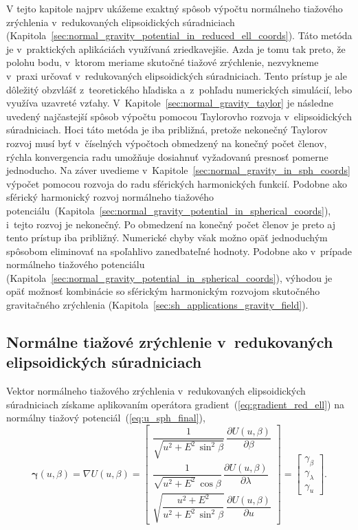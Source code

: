\documentclass[a4paper,12pt]{book}
\begin{document}
V tejto kapitole najprv ukážeme exaktný spôsob výpočtu normálneho tiažového 
zrýchlenia v~redukovaných elipsoidických súradniciach 
(Kapitola~\ref{sec:normal_gravity_potential_in_reduced_ell_coords}).  Táto 
metóda je v~praktických aplikáciách využívaná zriedkavejšie.  Azda je tomu tak 
preto, že polohu bodu, v~ktorom meriame skutočné tiažové zrýchlenie, nezvykneme 
v~praxi určovať v~redukovaných elipsoidických súradniciach.  Tento prístup je 
ale dôležitý obzvlášť z~teoretického hľadiska a~z~pohľadu numerických 
simulácií, lebo využíva uzavreté vzťahy.  
V~Kapitole~\ref{sec:normal_gravity_taylor} je následne uvedený najčastejší 
spôsob výpočtu pomocou Taylorovho rozvoja v~elipsoidických súradniciach.  Hoci 
táto metóda je iba približná, pretože nekonečný Taylorov rozvoj musí byť 
v~číselných výpočtoch obmedzený na konečný počet členov, rýchla konvergencia 
radu umožňuje dosiahnuť vyžadovanú presnosť pomerne jednoducho.  Na záver 
uvedieme v~Kapitole~\ref{sec:normal_gravity_in_sph_coords} výpočet pomocou 
rozvoja do radu sférických harmonických funkcií.  Podobne ako sférický 
harmonický rozvoj normálneho tiažového 
potenciálu~(Kapitola~\ref{sec:normal_gravity_potential_in_spherical_coords}), 
i~tejto rozvoj je nekonečný.  Po obmedzení na konečný počet členov je preto aj
tento prístup iba približný.  Numerické chyby však možno opäť jednoduchým 
spôsobom eliminovať na spoľahlivo zanedbateľné hodnoty.  Podobne ako v~prípade 
normálneho tiažového potenciálu 
(Kapitola~\ref{sec:normal_gravity_potential_in_spherical_coords}), výhodou je 
opäť možnosť kombinácie so sférickým harmonickým rozvojom skutočného 
gravitačného zrýchlenia (Kapitola~\ref{sec:sh_applications_gravity_field}).



\subsection{Normálne tiažové zrýchlenie v~redukovaných elipsoidických 
súradniciach}
\label{sec:normal_gravity_in_reduced_ell_coords}

Vektor normálneho tiažového zrýchlenia v~redukovaných elipsoidických 
súradniciach získame aplikovaním operátora gradient~(\ref{eq:gradient_red_ell}) 
na normálny tiažový potenciál~(\ref{eq:u_sph_final}),
%
\begin{equation}
\label{eq:gamma_vec_general}
\boldsymbol \gamma(u, \beta) = \nabla U(u, \beta) =
%
\begin{bmatrix}
\dfrac{1}{\sqrt{u^2 + E^2 \, \sin^2\beta}} \, \dfrac{\partial U(u, 
\beta)}{\partial \beta}\\[2ex]
\dfrac{1}{\sqrt{u^2 + E^2} \, \cos\beta} \, \dfrac{\partial U(u, 
\beta)}{\partial \lambda}\\[2ex]
\sqrt{\dfrac{u^2 + E^2}{u^2 + E^2 \, \sin^2\beta}} \, \dfrac{\partial U(u, 
\beta)}{\partial u}
\end{bmatrix}
%
=
%
\begin{bmatrix}
\gamma_\beta\\
\gamma_\lambda\\
\gamma_u
\end{bmatrix}
%
{.}
\end{equation}
\end{document}
